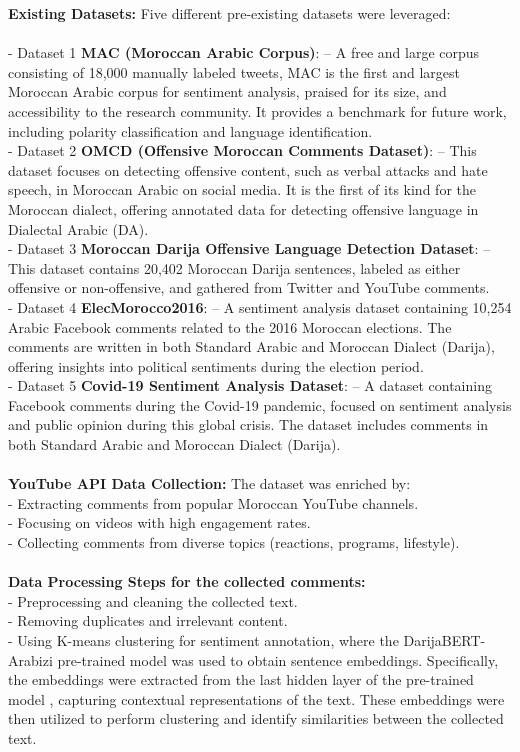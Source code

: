\documentclass[a4paper,40pt,twocolumn]{article}
\begin{document}
\textbf{Existing Datasets:} Five different pre-existing datasets were leveraged:  \\
\\- Dataset 1 \cite{data1} \textbf{MAC (Moroccan Arabic Corpus)}: – A free and large corpus consisting of 18,000 manually labeled tweets, MAC is the first and largest Moroccan Arabic corpus for sentiment analysis, praised for its size, and accessibility to the research community. It provides a benchmark for future work, including polarity classification and language identification.  
\\- Dataset 2 \cite{data2} \textbf{OMCD (Offensive Moroccan Comments Dataset)}: – This dataset focuses on detecting offensive content, such as verbal attacks and hate speech, in Moroccan Arabic on social media. It is the first of its kind for the Moroccan dialect, offering annotated data for detecting offensive language in Dialectal Arabic (DA).
\\- Dataset 3 \cite{data3} \textbf{Moroccan Darija Offensive Language Detection Dataset}: – This dataset contains 20,402 Moroccan Darija sentences, labeled as either offensive or non-offensive, and gathered from Twitter and YouTube comments. 
\\- Dataset 4 \cite{data4} \textbf{ElecMorocco2016}: – A sentiment analysis dataset containing 10,254 Arabic Facebook comments related to the 2016 Moroccan elections. The comments are written in both Standard Arabic and Moroccan Dialect (Darija), offering insights into political sentiments during the election period.  
\\- Dataset 5 \cite{data5} \textbf{Covid-19 Sentiment Analysis Dataset}: – A dataset containing Facebook comments during the Covid-19 pandemic, focused on sentiment analysis and public opinion during this global crisis. The dataset includes comments in both Standard Arabic and Moroccan Dialect (Darija).\\\\
\textbf{YouTube API Data Collection:} The dataset was enriched by:
    \\- Extracting comments from popular Moroccan YouTube channels.
    \\- Focusing on videos with high engagement rates.
    \\- Collecting comments from diverse topics (reactions, programs, lifestyle).\\\\
\textbf{Data Processing Steps for the collected comments:}
    \\- Preprocessing and cleaning the collected text.
    \\- Removing duplicates and irrelevant content.
   \\- Using K-means clustering for sentiment annotation, where the DarijaBERT-Arabizi pre-trained model \cite{darijabert} was used to obtain sentence embeddings. Specifically, the embeddings were extracted from the last hidden layer of the pre-trained model \cite{emb}, capturing contextual representations of the text. These embeddings were then utilized to perform clustering and identify similarities between the collected text.
\end{document}
